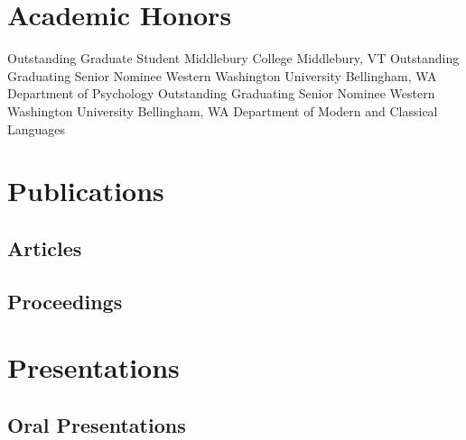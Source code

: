 \documentclass[11pt,letterpaper]{moderncv}
\begin{document}
\section{Academic Honors}

        {Outstanding Graduate Student}
        {Middlebury College}
        {Middlebury, VT}
        {}
        {}
        {}
        {Outstanding Graduating Senior Nominee}
        {Western Washington University}
        {Bellingham, WA}
        {}
        {Department of Psychology}
        {}
        {Outstanding Graduating Senior Nominee}
        {Western Washington University}
        {Bellingham, WA}
        {}
        {Department of Modern and Classical Languages}
        {}



\section{Publications}

\nobibliography*
\newcommand{}

\subsection{Articles}


\subsection{Proceedings}

\section{Presentations}
\subsection{Oral Presentations}
\end{document}
